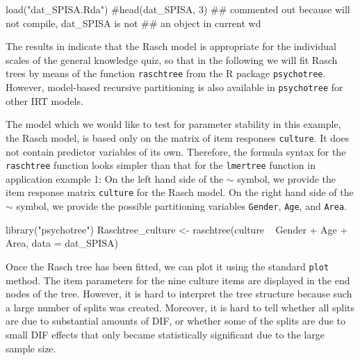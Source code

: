 \documentclass[doc,floatsintext,natbib]{apa7}
\begin{document}

\begin{Schunk}
\begin{Sinput}
 load("dat_SPISA.Rda")
 #head(dat_SPISA, 3) ## commented out because will not compile, dat_SPISA is not
                     ## an object in current wd
\end{Sinput}
\end{Schunk}

The results in \citet{SPISA:book} indicate that the Rasch model is appropriate for the individual scales of the general knowledge quiz, so that in the following we will fit Rasch trees by means of the function \texttt{raschtree} from the R package \texttt{psychotree}. However, model-based recursive partitioning is also available in \texttt{psychotree} for other IRT models.

The model which we would like to test for parameter stability in this example, the Rasch model, is based only on the matrix of item responses \texttt{culture}. It does not contain predictor variables of its own. Therefore, the formula syntax for the \texttt{raschtree} function looks simpler than that for the \texttt{lmertree} function in application example 1: On the left hand side of the $\sim$ symbol, we provide the item response matrix \texttt{culture} for the Rasch model. On the right hand side of the $\sim$ symbol, we provide the possible partitioning variables \texttt{Gender}, \texttt{Age}, and \texttt{Area}.



\begin{Schunk}
\begin{Sinput}
 library("psychotree")
 Raschtree_culture <- raschtree(culture ~  Gender + Age + Area,
                                data = dat_SPISA)
\end{Sinput}
\end{Schunk}

Once the Rasch tree has been fitted, we can plot it using the standard \texttt{plot} method. The item parameters for the nine culture items are displayed in the end nodes of the tree. However, it is hard to interpret the tree structure because such a large number of splits was created. Moreover, it is hard to tell whether all splits are due to substantial amounts of DIF, or whether some of the splits are due to small DIF effects that only became statistically significant due to the large sample size.
\end{document}
